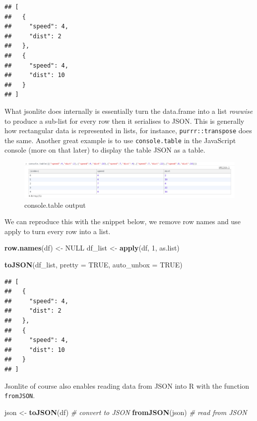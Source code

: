 \documentclass[
]{krantz}
\makeatletter
\newenvironment{Shaded}{\begin{snugshade}}{\end{snugshade}}
\newcommand{\CommentTok}[1]{\textcolor[rgb]{0.37,0.37,0.37}{\textit{#1}}}
\newcommand{\DataTypeTok}[1]{\textcolor[rgb]{0.27,0.27,0.27}{#1}}
\newcommand{\DecValTok}[1]{\textcolor[rgb]{0.06,0.06,0.06}{#1}}
\newcommand{\KeywordTok}[1]{\textcolor[rgb]{0.27,0.27,0.27}{\textbf{#1}}}
\newcommand{\NormalTok}[1]{#1}
\newcommand{\OtherTok}[1]{\textcolor[rgb]{0.37,0.37,0.37}{#1}}
\newcommand{\StringTok}[1]{\textcolor[rgb]{0.5,0.5,0.5}{#1}}
\newenvironment{kframe}{%
\medskip{}
\setlength{\fboxsep}{.8em}
 \def\at@end@of@kframe{}%
 \ifinner\ifhmode%
  \def\at@end@of@kframe{\end{minipage}}%
  \begin{minipage}{\columnwidth}%
 \fi\fi%
 \def\FrameCommand##1{\hskip\@totalleftmargin \hskip-\fboxsep
 \colorbox{shadecolor}{##1}\hskip-\fboxsep
     \hskip-\linewidth \hskip-\@totalleftmargin \hskip\columnwidth}%
 \MakeFramed {\advance\hsize-\width
   \@totalleftmargin\z@ \linewidth\hsize
   \@setminipage}}%
 {\par\unskip\endMakeFramed%
 \at@end@of@kframe}
\renewenvironment{Shaded}{\begin{kframe}}{\end{kframe}}
\makeatother
\begin{document}
\begin{verbatim}
## [
##   {
##     "speed": 4,
##     "dist": 2
##   },
##   {
##     "speed": 4,
##     "dist": 10
##   }
## ]
\end{verbatim}

What jsonlite does internally is essentially turn the data.frame into a list \emph{rowwise} to produce a sub-list for every row then it serialises to JSON. This is generally how rectangular data is represented in lists, for instance, \texttt{purrr::transpose} does the same. Another great example is to use \texttt{console.table} in the JavaScript console (more on that later) to display the table JSON as a table.

\begin{figure}
\centering
\includegraphics{images/console-table.png}
\caption{console.table output}
\end{figure}

We can reproduce this with the snippet below, we remove row names and use apply to turn every row into a list.

\begin{Shaded}
\begin{Highlighting}[]
\KeywordTok{row.names}\NormalTok{(df) \textless{}{-}}\StringTok{ }\OtherTok{NULL}
\NormalTok{df\_list \textless{}{-}}\StringTok{ }\KeywordTok{apply}\NormalTok{(df, }\DecValTok{1}\NormalTok{, as.list)}

\KeywordTok{toJSON}\NormalTok{(df\_list, }\DataTypeTok{pretty =} \OtherTok{TRUE}\NormalTok{, }\DataTypeTok{auto\_unbox =} \OtherTok{TRUE}\NormalTok{)}
\end{Highlighting}
\end{Shaded}

\begin{verbatim}
## [
##   {
##     "speed": 4,
##     "dist": 2
##   },
##   {
##     "speed": 4,
##     "dist": 10
##   }
## ]
\end{verbatim}

Jsonlite of course also enables reading data from JSON into R with the function \texttt{fromJSON}.

\begin{Shaded}
\begin{Highlighting}[]
\NormalTok{json \textless{}{-}}\StringTok{ }\KeywordTok{toJSON}\NormalTok{(df) }\CommentTok{\# convert to JSON}
\KeywordTok{fromJSON}\NormalTok{(json) }\CommentTok{\# read from JSON}
\end{Highlighting}
\end{Shaded}
\end{document}
